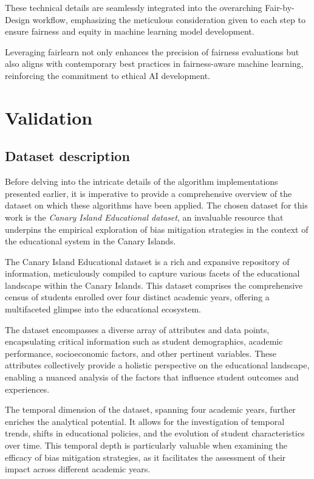 \documentclass[12pt,a4paper,openright,twoside]{book}
\begin{document}
These technical details are seamlessly integrated into the overarching Fair-by-Design workflow, emphasizing the meticulous consideration given to each step to ensure fairness and equity in machine learning model development.

Leveraging fairlearn not only enhances the precision of fairness evaluations but also aligns with contemporary best practices in fairness-aware machine learning, reinforcing the commitment to ethical AI development.

\chapter{Validation} %
\label{chap:validation}
\section{Dataset description}

Before delving into the intricate details of the algorithm implementations presented earlier, it is imperative to provide a comprehensive overview of the dataset on which these algorithms have been applied. The chosen dataset for this work is the \emph{Canary Island Educational dataset}, an invaluable resource that underpins the empirical exploration of bias mitigation strategies in the context of the educational system in the Canary Islands. 

The Canary Island Educational dataset is a rich and expansive repository of information, meticulously compiled to capture various facets of the educational landscape within the Canary Islands. This dataset comprises the comprehensive census of students enrolled over four distinct academic years, offering a multifaceted glimpse into the educational ecosystem. 

The dataset encompasses a diverse array of attributes and data points, encapsulating critical information such as student demographics, academic performance, socioeconomic factors, and other pertinent variables. These attributes collectively provide a holistic perspective on the educational landscape, enabling a nuanced analysis of the factors that influence student outcomes and experiences. 

The temporal dimension of the dataset, spanning four academic years, further enriches the analytical potential. It allows for the investigation of temporal trends, shifts in educational policies, and the evolution of student characteristics over time. This temporal depth is particularly valuable when examining the efficacy of bias mitigation strategies, as it facilitates the assessment of their impact across different academic years. 
\end{document}
